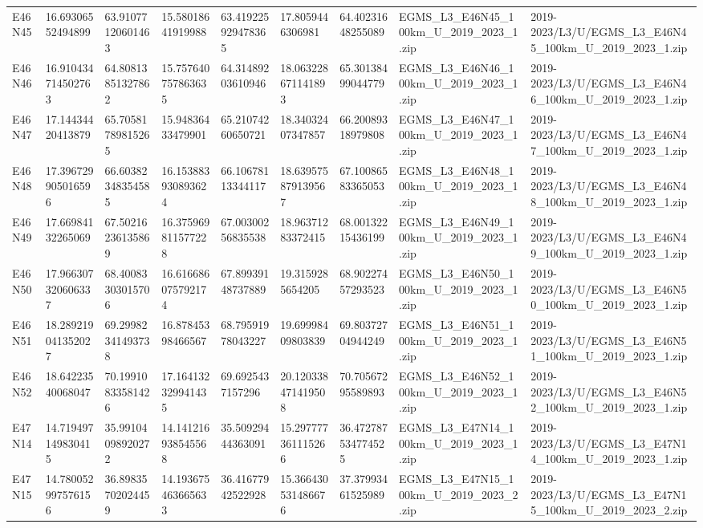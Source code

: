 \begin{landscape}
\begin{longtable}{lllllllll}
E46N45 & 16.69306552494899 & 63.91077120601463 & 15.58018641919988 & 63.419225929478365 & 17.8059446306981 & 64.40231648255089 & EGMS\_L3\_E46N45\_100km\_U\_2019\_2023\_1.zip & 2019-2023/L3/U/EGMS\_L3\_E46N45\_100km\_U\_2019\_2023\_1.zip \\
E46N46 & 16.910434714502763 & 64.80813851327862 & 15.757640757863635 & 64.31489203610946 & 18.063228671141893 & 65.30138499044779 & EGMS\_L3\_E46N46\_100km\_U\_2019\_2023\_1.zip & 2019-2023/L3/U/EGMS\_L3\_E46N46\_100km\_U\_2019\_2023\_1.zip \\
E46N47 & 17.14434420413879 & 65.70581789815265 & 15.94836433479901 & 65.21074260650721 & 18.34032407347857 & 66.20089318979808 & EGMS\_L3\_E46N47\_100km\_U\_2019\_2023\_1.zip & 2019-2023/L3/U/EGMS\_L3\_E46N47\_100km\_U\_2019\_2023\_1.zip \\
E46N48 & 17.396729905016596 & 66.60382348354585 & 16.153883930893624 & 66.10678113344117 & 18.639575879139567 & 67.10086583365053 & EGMS\_L3\_E46N48\_100km\_U\_2019\_2023\_1.zip & 2019-2023/L3/U/EGMS\_L3\_E46N48\_100km\_U\_2019\_2023\_1.zip \\
E46N49 & 17.66984132265069 & 67.50216236135869 & 16.375969811577228 & 67.00300256835538 & 18.96371283372415 & 68.00132215436199 & EGMS\_L3\_E46N49\_100km\_U\_2019\_2023\_1.zip & 2019-2023/L3/U/EGMS\_L3\_E46N49\_100km\_U\_2019\_2023\_1.zip \\
E46N50 & 17.966307320606337 & 68.40083303015706 & 16.616686075792174 & 67.89939148737889 & 19.3159285654205 & 68.90227457293523 & EGMS\_L3\_E46N50\_100km\_U\_2019\_2023\_1.zip & 2019-2023/L3/U/EGMS\_L3\_E46N50\_100km\_U\_2019\_2023\_1.zip \\
E46N51 & 18.289219041352027 & 69.29982341493738 & 16.87845398466567 & 68.79591978043227 & 19.69998409803839 & 69.80372704944249 & EGMS\_L3\_E46N51\_100km\_U\_2019\_2023\_1.zip & 2019-2023/L3/U/EGMS\_L3\_E46N51\_100km\_U\_2019\_2023\_1.zip \\
E46N52 & 18.64223540068047 & 70.19910833581426 & 17.164132329941435 & 69.6925437157296 & 20.120338471419508 & 70.70567295589893 & EGMS\_L3\_E46N52\_100km\_U\_2019\_2023\_1.zip & 2019-2023/L3/U/EGMS\_L3\_E46N52\_100km\_U\_2019\_2023\_1.zip \\
E47N14 & 14.719497149830415 & 35.99104098920272 & 14.141216938545568 & 35.50929444363091 & 15.297777361115266 & 36.472787534774525 & EGMS\_L3\_E47N14\_100km\_U\_2019\_2023\_1.zip & 2019-2023/L3/U/EGMS\_L3\_E47N14\_100km\_U\_2019\_2023\_1.zip \\
E47N15 & 14.780052997576156 & 36.89835702024459 & 14.193675463665633 & 36.41677942522928 & 15.366430531486676 & 37.37993461525989 & EGMS\_L3\_E47N15\_100km\_U\_2019\_2023\_2.zip & 2019-2023/L3/U/EGMS\_L3\_E47N15\_100km\_U\_2019\_2023\_2.zip \\

\end{longtable}
\end{landscape}
